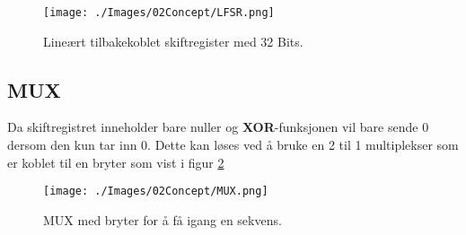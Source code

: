\begin{figure}[!hbt]
	\centering
	\texttt{[image: ./Images/02Concept/LFSR.png]}
	\caption{Lineært tilbakekoblet skiftregister med 32 Bits.}
	\label{fig:LFSR}
\end{figure}

\subsection{MUX}
\label{sec:MUX}

Da skiftregistret inneholder bare nuller og \textbf{XOR}-funksjonen vil bare sende 0 dersom den kun tar inn 0. Dette kan løses ved å bruke en 2 til 1 multiplekser som er koblet til en bryter som vist i figur \ref{fig:MUX}


\begin{figure}[!hbt]
	\centering
	\texttt{[image: ./Images/02Concept/MUX.png]}
	\caption{MUX med bryter for å få igang en sekvens.}
	\label{fig:MUX}
\end{figure}

